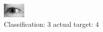 \begin{figure}[h!]
\begin{center}
\includegraphics[width=0.60\columnwidth]{figures/ID3250_class_3_target_4.png}
\end{center}
\caption{ Classification: 3 actual target: 4}
\label{fig:ID3250_class_3_target_4}
\end{figure}
